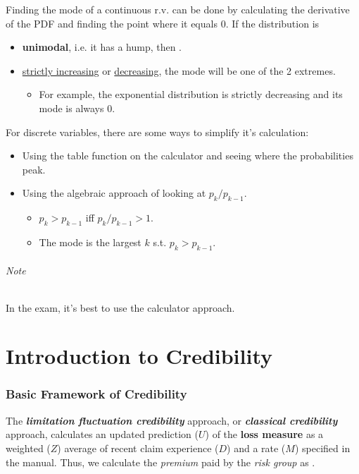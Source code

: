 \documentclass[english]{article}
\begin{document}
\begin{multicols*}{2}
\begin{definitionNOHFILL}[Mode]
Finding the mode of a continuous r.v. can be done by calculating the derivative of the PDF and finding the point where it equals $0$.  If the distribution is
\begin{itemize}
	\item	\textbf{unimodal}, i.e. it has a hump, then .
	\item	\underline{strictly increasing} or \underline{decreasing}, the mode will be one of the 2 extremes.
		\begin{itemize}
		\item	For example, the exponential distribution is strictly decreasing and its mode is always $0$.
		\end{itemize}
\end{itemize}

\bigskip

For discrete variables, there are some ways to simplify it's calculation:
\begin{itemize}
	\item	Using the table function on the calculator and seeing where the probabilities peak.
	\item	Using the algebraic approach of looking at $p_{k} / p_{k - 1}$.
		\begin{itemize}
		\item	$p_{k} > p_{k - 1}$ iff $p_{k}/p_{k - 1} > 1$.
		\item	The mode is the largest $k$ s.t. $p_{k} > p_{k - 1}$.
		\end{itemize}
\end{itemize}

\paragraph{Note}	In the exam, it's best to use the calculator approach.
\end{definitionNOHFILL}


\newpage
\part{Introduction to Credibility}\label{part:cred}
\section{Basic Framework of Credibility}\label{sec:credBasics}
\begin{rappel_enhanced}[Context]
The \textbf{\textit{limitation fluctuation credibility}} approach, or \textbf{\textit{classical credibility}} approach, calculates an updated prediction ($U$) of the \textbf{loss measure} as a weighted ($Z$) average of recent claim experience ($D$) and a rate ($M$) specified in the manual. Thus, we calculate the \textit{premium} paid by the \textit{risk group} as .
\end{rappel_enhanced}


\end{multicols*}
\end{document}
